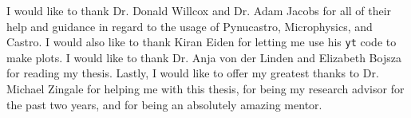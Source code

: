 \documentclass[preprint]{aastex62}
\begin{document}
I would like to thank Dr. Donald Willcox and Dr. Adam Jacobs for all of their help and guidance in regard to the usage of Pynucastro, Microphysics, and Castro. I would also like to thank Kiran Eiden for letting me use his {\tt yt} code to make plots. I would like to thank Dr. Anja von der Linden and Elizabeth Bojsza for reading my thesis. Lastly, I would like to offer my greatest thanks to Dr. Michael Zingale for helping me with this thesis, for being my research advisor for the past two years, and for being an absolutely amazing mentor. 


\end{document}
